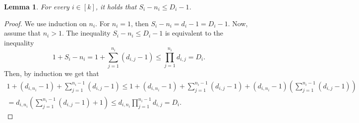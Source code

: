 \documentclass[11pt]{amsart}
\numberwithin{equation}{section}
\theoremstyle{plain}
\numberwithin{theorem}{section}
\newtheorem{lemma}[theorem]{Lemma}
\theoremstyle{definition}
\begin{document}
\begin{lemma}\label{lemma: inequality ds}
    For every $i\in[k]$, it holds that $S_i-n_i\le D_i-1$.
\end{lemma}
\begin{proof}
We use induction on $n_i$. For $n_i=1$, then $S_i-n_i=d_i-1=D_i-1$. Now, assume that $n_i>1$. The inequality $S_i-n_i\le D_i-1$ is equivalent to the inequality
    $$\displaystyle1+S_i-n_i=1+\sum_{j=1}^{n_i}(d_{i,j}-1)\le\prod_{j=1}^{n_i}d_{i,j}=D_i.$$
    Then, by induction we get that 
    \[
    \begin{array}{c}
    \displaystyle 1+(d_{i,n_i}-1)+\sum_{j=1}^{n_{i}-1}(d_{i,j}-1)\leq 
    1+(d_{i,n_i}-1)+\sum_{j=1}^{n_i-1}(d_{i,j}-1)+(d_{i,n_i}-1)\left(\sum_{j=1}^{n_i-1}(d_{i,j}-1)\right)\\ \displaystyle
   = d_{i,n_i}\left(\sum_{j=1}^{n_i-1}(d_{i,j}-1)+1\right)\leq d_{i,n_i}\prod_{j=1}^{n_i-1}d_{i,j}=D_i.
    \end{array}\]
\end{proof}
\end{document}
